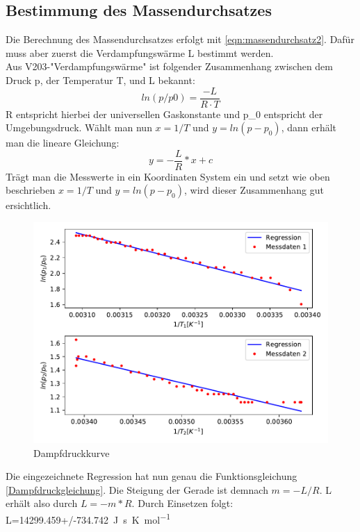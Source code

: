 \subsection{Bestimmung des Massendurchsatzes}
Die Berechnung des Massendurchsatzes erfolgt mit \eqref{eqn:massendurchsatz2}. Dafür muss aber zuerst die 
Verdampfungswärme L bestimmt werden. 
\\
Aus V203-"Verdampfungswärme" ist folgender Zusammenhang zwischen dem Druck p, der Temperatur T, und L bekannt:
\begin{equation}
  ln(p/p0)=\frac{-L}{R \cdot T}
\end{equation}
R entspricht hierbei der universellen Gaskonstante und p_0 entspricht der Umgebungsdruck.
Wählt man nun $x=1/T$ und $y=ln(p-p_0)$, dann erhält man die lineare Gleichung:
\begin{equation}
  y=-\frac{L}{R}*x+c \label{Dampfdruckgleichung}
\end{equation}
Trägt man die Messwerte in ein Koordinaten System ein und setzt wie oben beschrieben $x=1/T$ und $y=ln(p-p_0)$,
wird dieser Zusammenhang gut ersichtlich.
\begin{figure}
  \centering
  \includegraphics[scale = 0.75]{Druckverlaeufe.pdf}
  \caption{Dampfdruckkurve}
  \label{fig:Dampfdruckkurve}
\end{figure}
Die eingezeichnete Regression hat nun genau die Funktionsgleichung \eqref{Dampfdruckgleichung}. Die Steigung der 
Gerade ist demnach $m=-L/R$. L erhält also durch $L=-m*R$. Durch Einsetzen folgt:
\\
L=\SI{14299.459+/-734.742}{\joule\second\kelvin\per\mole}
\\
